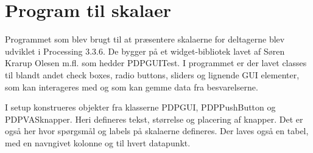\section{Program til skalaer}
\label{TestAfSkalaProgramSkala}
%
Programmet som blev brugt til at præsentere skalaerne for deltagerne blev udviklet i Processing 3.3.6. De bygger på et widget-bibliotek lavet af Søren Krarup Olesen m.fl. som hedder PDPGUITest. I programmet er der lavet classes til blandt andet check boxes, radio buttons, sliders og lignende GUI elementer, som kan interageres med og som kan gemme data fra besvarelserne. 

I setup konstrueres objekter fra klasserne PDPGUI, PDPPushButton og PDPVASknapper. Heri defineres tekst, størrelse og placering af knapper. Det er også her hvor spørgsmål og labels på skalaerne defineres.
Der laves også en tabel, med en navngivet kolonne og til hvert datapunkt.

